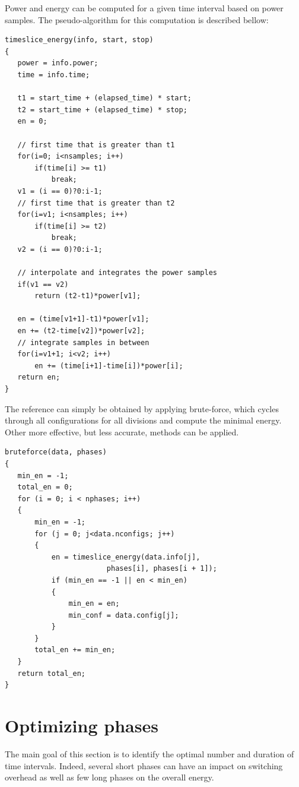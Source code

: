 Power and energy can be computed for a given time interval based on power samples. The pseudo-algorithm for this computation is described bellow:

\begin{lstlisting}
timeslice_energy(info, start, stop)
{
   power = info.power;
   time = info.time;
   
   t1 = start_time + (elapsed_time) * start;
   t2 = start_time + (elapsed_time) * stop;
   en = 0;

   // first time that is greater than t1
   for(i=0; i<nsamples; i++)
       if(time[i] >= t1)
           break;
   v1 = (i == 0)?0:i-1;
   // first time that is greater than t2
   for(i=v1; i<nsamples; i++)
       if(time[i] >= t2)
           break;
   v2 = (i == 0)?0:i-1;
 
   // interpolate and integrates the power samples
   if(v1 == v2)
       return (t2-t1)*power[v1];
 
   en = (time[v1+1]-t1)*power[v1];
   en += (t2-time[v2])*power[v2];
   // integrate samples in between
   for(i=v1+1; i<v2; i++)
       en += (time[i+1]-time[i])*power[i];
   return en;
}
\end{lstlisting}

The reference can simply be obtained by applying brute-force, which cycles through all configurations for all divisions and compute the minimal energy. Other more effective, but less accurate, methods can be applied.

\begin{lstlisting}
bruteforce(data, phases)
{
   min_en = -1;
   total_en = 0;
   for (i = 0; i < nphases; i++)
   {
       min_en = -1;
       for (j = 0; j<data.nconfigs; j++)
       {
           en = timeslice_energy(data.info[j], 
                        phases[i], phases[i + 1]);
           if (min_en == -1 || en < min_en)
           {
               min_en = en;
               min_conf = data.config[j];
           }
       }
       total_en += min_en;
   }
   return total_en;
}
\end{lstlisting}

\section{Optimizing phases} \label{sec:optimizing_phases}
The main goal of this section is to identify the optimal number and duration of time intervals. Indeed, several short phases can have an impact on switching overhead as well as few long phases on the overall energy. 

